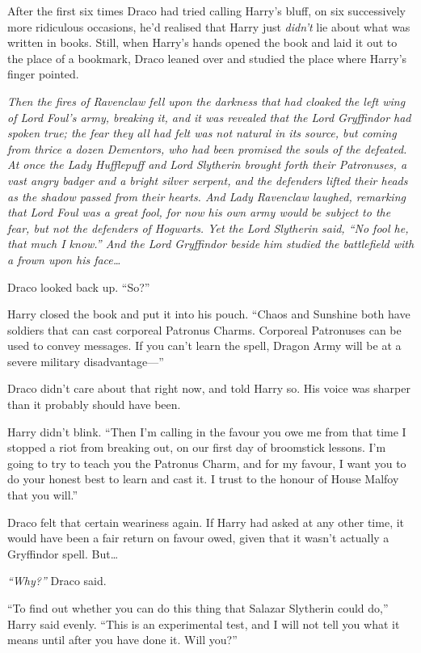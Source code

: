 After the first six times Draco had tried calling Harry's bluff, on six
successively more ridiculous occasions, he'd realised that Harry just
\emph{didn't} lie about what was written in books. Still, when Harry's
hands opened the book and laid it out to the place of a bookmark, Draco
leaned over and studied the place where Harry's finger pointed.

\emph{Then the fires of Ravenclaw fell upon the darkness that had
cloaked the left wing of Lord Foul's army, breaking it, and it was
revealed that the Lord Gryffindor had spoken true; the fear they all had
felt was not natural in its source, but coming from thrice a dozen
Dementors, who had been promised the souls of the defeated. At once the
Lady Hufflepuff and Lord Slytherin brought forth their Patronuses, a
vast angry badger and a bright silver serpent, and the defenders lifted
their heads as the shadow passed from their hearts. And Lady Ravenclaw
laughed, remarking that Lord Foul was a great fool, for now his own army
would be subject to the fear, but not the defenders of Hogwarts. Yet the
Lord Slytherin said, ``No fool he, that much I know.'' And the Lord
Gryffindor beside him studied the battlefield with a frown upon his
face\ldots{}}

Draco looked back up. ``So?''

Harry closed the book and put it into his pouch. ``Chaos and Sunshine
both have soldiers that can cast corporeal Patronus Charms. Corporeal
Patronuses can be used to convey messages. If you can't learn the spell,
Dragon Army will be at a severe military disadvantage---''

Draco didn't care about that right now, and told Harry so. His voice was
sharper than it probably should have been.

Harry didn't blink. ``Then I'm calling in the favour you owe me from
that time I stopped a riot from breaking out, on our first day of
broomstick lessons. I'm going to try to teach you the Patronus Charm,
and for my favour, I want you to do your honest best to learn and cast
it. I trust to the honour of House Malfoy that you will.''

Draco felt that certain weariness again. If Harry had asked at any other
time, it would have been a fair return on favour owed, given that it
wasn't actually a Gryffindor spell. But\ldots{}

\emph{``Why?''} Draco said.

``To find out whether you can do this thing that Salazar Slytherin could
do,'' Harry said evenly. ``This is an experimental test, and I will not
tell you what it means until after you have done it. Will you?''

